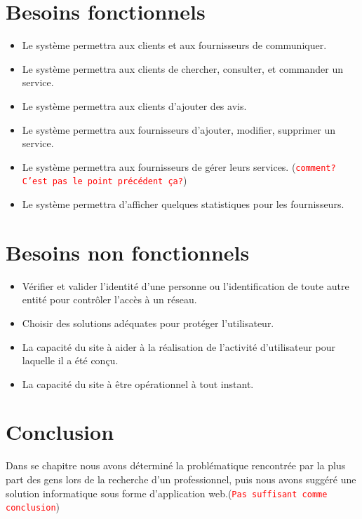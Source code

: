 \documentclass[french]{report}
\newcommand\rmq[1]{\textcolor{red}{\tt #1}}
\begin{document}
\section{Besoins fonctionnels}

\begin{itemize}
    \item Le système permettra aux clients et aux fournisseurs de communiquer.
    \item Le système permettra aux clients de chercher, consulter, et commander
        un service.
    \item Le système permettra aux clients d'ajouter des avis.
    \item Le système permettra aux fournisseurs d'ajouter, modifier, supprimer
        un service.
    \item Le système permettra aux fournisseurs de gérer leurs services.
        (\rmq{comment? C'est pas le point précédent ça?})
    \item Le système permettra d'afficher quelques statistiques pour les
        fournisseurs.
\end{itemize}

\section{Besoins non fonctionnels}

\begin{itemize}
    \item Vérifier et valider l'identité d'une personne ou
        l'identification de toute autre entité pour contrôler l'accès à un
        réseau.
    \item Choisir des solutions adéquates pour protéger l'utilisateur.
    \item La capacité du site à aider à la réalisation de l'activité
        d'utilisateur pour laquelle il a été conçu.
    \item La capacité du site à être opérationnel à tout instant.
\end{itemize}

\section{Conclusion}

Dans se chapitre nous avons déterminé la problématique rencontrée par la plus
part des gens lors de la recherche d'un professionnel, puis nous avons suggéré
une solution informatique sous forme d'application web.(\rmq{Pas suffisant comme
conclusion})
\end{document}
